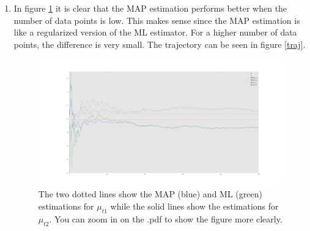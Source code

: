 \documentclass[paper=a4, fontsize=10pt]{scrartcl} %
\numberwithin{equation}{section} %
\numberwithin{figure}{section} %
\numberwithin{table}{section} %
\begin{document}
\begin{enumerate}
			\begin{align}
				\boldsymbol\mu = \begin{pmatrix} 0.67161114 \\ 0.91312478 \end{pmatrix}
			\end{align}

			The code snippet:

			\begin{verbatim}
					for i in range(1, np.size(pairs, 0)+1):
					    S = np.linalg.inv(np.linalg.inv(sigma[i-1]) + np.linalg.inv(sigma_t))
					    mu[i] = np.dot(S, (np.dot(np.linalg.inv(sigma_t), pairs[i-1]) +
					            np.dot(np.linalg.inv(sigma[i-1]), mu[i-1])))
					    sigma[i] = S

					    print mu[i]
			\end{verbatim}

			Note that \verb|np.dot| is equivalent to Matlab's *-operator.
	\item In figure \ref{map} it is clear that the MAP estimation performs better when the number of data points is low. This makes sense since the MAP estimation is like a regularized version of the ML estimator. For a higher number of data points, the difference is very small. The trajectory can be seen in figure \ref{traj}.

			\begin{figure}[H]
				\centering
				\hspace*{-10em}\includegraphics[width=1.3\textwidth]{exercise_134.png}
				\caption{The two dotted lines show the MAP (blue) and ML (green) estimations for $\mu_{t1}$ while the solid lines show the estimations for $\mu_{t2}$. You can zoom in on the .pdf to show the figure more clearly.}
				\label{map}
			\end{figure}


\end{enumerate}
\end{document}
